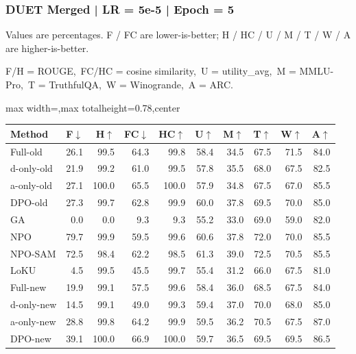 \documentclass[aspectratio=169,11pt]{beamer}
\begin{document}
\begin{frame}[t]
\frametitle{DUET Merged | LR = 5e-5 | Epoch = 5}
{\tiny Values are percentages. F / FC are lower-is-better; H / HC / U / M / T / W / A are higher-is-better.}

{\tiny F/H = ROUGE,\ FC/HC = cosine similarity,\ U = utility\_avg,\ M = MMLU-Pro,\ T = TruthfulQA,\ W = Winogrande,\ A = ARC.}

\vspace{0.35em}
\centering
\scriptsize
\setlength{\tabcolsep}{3.6pt}
\renewcommand{\arraystretch}{1.05}
\begin{adjustbox}{max width=\textwidth,max totalheight=0.78\textheight,center}
\begin{tabular}{l*{9}{r}}
\toprule
Method & F$\downarrow$ & H$\uparrow$ & FC$\downarrow$ & HC$\uparrow$ & U$\uparrow$ & M$\uparrow$ & T$\uparrow$ & W$\uparrow$ & A$\uparrow$ \\
\midrule
\rowcolor{blue!10}
Full-old & 26.1 & 99.5 & 64.3 & 99.8 & 58.4 & 34.5 & 67.5 & 71.5 & 84.0 \\
\rowcolor{orange!10}
d-only-old & 21.9 & 99.2 & 61.0 & 99.5 & 57.8 & 35.5 & 68.0 & 67.5 & 82.5 \\
\rowcolor{green!10}
a-only-old & 27.1 & 100.0 & 65.5 & 100.0 & 57.9 & 34.8 & 67.5 & 67.0 & 85.5 \\
\rowcolor{gray!8}
DPO-old & 27.3 & 99.7 & 62.8 & 99.9 & 60.0 & 37.8 & 69.5 & 70.0 & 85.0 \\
\rowcolor{gray!8}
GA & 0.0 & 0.0 & 9.3 & 9.3 & 55.2 & 33.0 & 69.0 & 59.0 & 82.0 \\
\rowcolor{gray!8}
NPO & 79.7 & 99.9 & 59.5 & 99.6 & 60.6 & 37.8 & 72.0 & 70.0 & 85.5 \\
\rowcolor{gray!8}
NPO-SAM & 72.5 & 98.4 & 62.2 & 98.5 & 61.3 & 39.0 & 72.5 & 70.5 & 85.5 \\
\rowcolor{gray!8}
LoKU & 4.5 & 99.5 & 45.5 & 99.7 & 55.4 & 31.2 & 66.0 & 67.5 & 81.0 \\
\rowcolor{blue!20}
Full-new & 19.9 & 99.1 & 57.5 & 99.6 & 58.4 & 36.0 & 68.5 & 67.5 & 84.0 \\
\rowcolor{orange!20}
d-only-new & 14.5 & 99.1 & 49.0 & 99.3 & 59.4 & 37.0 & 70.0 & 68.0 & 85.0 \\
\rowcolor{green!20}
a-only-new & 28.8 & 99.8 & 64.2 & 99.9 & 59.5 & 36.2 & 70.5 & 67.5 & 87.0 \\
\rowcolor{gray!15}
DPO-new & 39.1 & 100.0 & 66.9 & 100.0 & 59.7 & 36.5 & 69.5 & 69.5 & 86.5 \\
\bottomrule
\end{tabular}
\end{adjustbox}
\end{frame}
\end{document}

